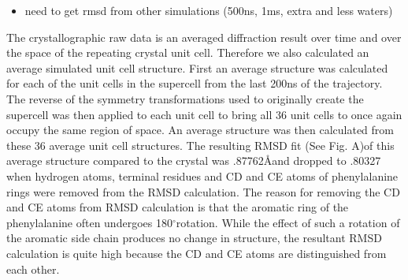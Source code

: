 \documentclass[12pt,letterpaper]{report}
\newcommand{\degr}{\ensuremath{^\circ}}
\begin{document}
\begin{enumerate}
	\begin{itemize}
	\item need to get rmsd from other simulations (500ns, 1ms, extra and less waters)
	\end{itemize}
	
The crystallographic raw data is an averaged diffraction result over time and over the space of the repeating crystal unit cell. Therefore we also calculated an average simulated unit cell structure. First an average structure was calculated for each of the unit cells in the supercell from the last 200ns of the trajectory. The reverse of the symmetry transformations used to originally create the supercell was then applied to each unit cell to bring all 36 unit cells to once again occupy the same region of space. An average structure was then calculated from these 36 average unit cell structures. The resulting RMSD fit (See Fig. A)of this average structure compared to the crystal was .87762\AA and dropped to .80327 when hydrogen atoms, terminal residues and CD and CE atoms of phenylalanine rings were removed from the RMSD calculation. The reason for removing the CD and CE atoms from RMSD calculation is that the aromatic ring of the phenylalanine often undergoes 180\degr rotation. While the effect of such a rotation of the aromatic side chain produces no change in structure, the resultant RMSD calculation is quite high because the CD and CE atoms are distinguished from each other.

	\begin{figure}[H]
	\centering
	\setcounter{subfigure}{0}
	\end{figure}



\end{enumerate}
\end{document}
